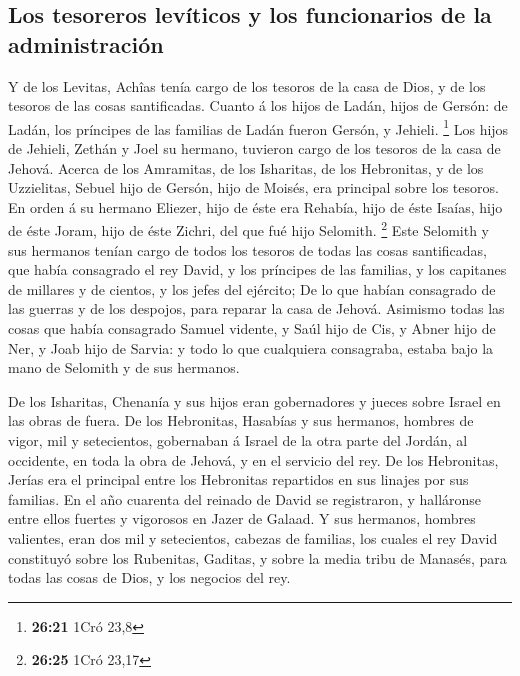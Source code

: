 \hypertarget{los-tesoreros-levuxedticos-y-los-funcionarios-de-la-administraciuxf3n}{%
\subsection{Los tesoreros levíticos y los funcionarios de la
administración}\label{los-tesoreros-levuxedticos-y-los-funcionarios-de-la-administraciuxf3n}}

 Y de los Levitas, Achîas tenía cargo de los tesoros de la
casa de Dios, y de los tesoros de las cosas santificadas. 
Cuanto á los hijos de Ladán, hijos de Gersón: de Ladán, los príncipes de
las familias de Ladán fueron Gersón, y Jehieli. \footnote{\textbf{26:21}
  1Cró 23,8}  Los hijos de Jehieli, Zethán y Joel su
hermano, tuvieron cargo de los tesoros de la casa de Jehová.
 Acerca de los Amramitas, de los Isharitas, de los
Hebronitas, y de los Uzzielitas,  Sebuel hijo de Gersón,
hijo de Moisés, era principal sobre los tesoros.  En orden
á su hermano Eliezer, hijo de éste era Rehabía, hijo de éste Isaías,
hijo de éste Joram, hijo de éste Zichri, del que fué hijo Selomith.
\footnote{\textbf{26:25} 1Cró 23,17}  Este Selomith y sus
hermanos tenían cargo de todos los tesoros de todas las cosas
santificadas, que había consagrado el rey David, y los príncipes de las
familias, y los capitanes de millares y de cientos, y los jefes del
ejército;  De lo que habían consagrado de las guerras y de
los despojos, para reparar la casa de Jehová.  Asimismo
todas las cosas que había consagrado Samuel vidente, y Saúl hijo de Cis,
y Abner hijo de Ner, y Joab hijo de Sarvia: y todo lo que cualquiera
consagraba, estaba bajo la mano de Selomith y de sus hermanos.

 De los Isharitas, Chenanía y sus hijos eran gobernadores y
jueces sobre Israel en las obras de fuera.  De los
Hebronitas, Hasabías y sus hermanos, hombres de vigor, mil y
setecientos, gobernaban á Israel de la otra parte del Jordán, al
occidente, en toda la obra de Jehová, y en el servicio del rey.
 De los Hebronitas, Jerías era el principal entre los
Hebronitas repartidos en sus linajes por sus familias. En el año
cuarenta del reinado de David se registraron, y halláronse entre ellos
fuertes y vigorosos en Jazer de Galaad.  Y sus hermanos,
hombres valientes, eran dos mil y setecientos, cabezas de familias, los
cuales el rey David constituyó sobre los Rubenitas, Gaditas, y sobre la
media tribu de Manasés, para todas las cosas de Dios, y los negocios del
rey.

